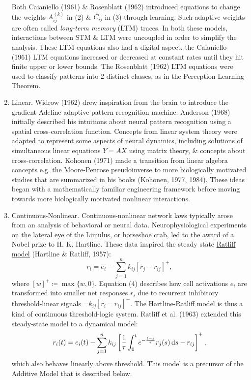 \documentclass{article}
\begin{document}
\begin{enumerate}
	Both Caianiello (1961) \& Rosenblatt (1962) introduced equations to change the weights $A_{ij}^{(k)}$ in (2) \& $C_{ij}$ in (3) through learning. Such adaptive weights are often called {\it long-term memory} (LTM) traces. In both these models, interactions between STM \& LTM were uncoupled in order to simplify the analysis. These LTM equations also had a digital aspect. the Caianiello (1961) LTM equations increased or decreased at constant rates until they hit finite upper or lower bounds. The Rosenblatt (1962) LTM equations were used to classify patterns into 2 distinct classes, as in the Perception Learning Theorem.
	\item {\sf Linear.} Widrow (1962) drew inspiration from the brain to introduce the gradient Adeline adaptive pattern recognition machine. Anderson (1968) initially described his intuitions about neural pattern recognition using a spatial cross-correlation function. Concepts from linear system theory were adapted to represent some aspects of neural dynamics, including solutions of simultaneous linear equations $Y = AX$ using matrix theory, \& concepts about cross-correlation. Kohonen (1971) made a transition from linear algebra concepts e.g. the Moore-Penrose pseudoinverse to more biologically motivated studies that are summarized in his books (Kohonen, 1977, 1984). These ideas began with a mathematically familiar engineering framework before moving towards more biologically motivated nonlinear interactions.
	\item {\sf Continuous-Nonlinear.} Continuous-nonlinear network laws typically arose from an analysis of behavioral or neural data. Neurophysiological experiments on the lateral eye of the Limulus, or horseshoe crab, led to the award of a Nobel prize to {\sc H. K. Hartline}. These data inspired the steady state \href{http://www.scholarpedia.org/article/Hartline-Ratliff_model}{Ratliff model} (Hartline \& Ratliff, 1957):
	\begin{equation}
		r_i = e_i - \sum_{j=1}^n k_{ij}[r_j - r_{ij}]^+,
	\end{equation}
	where $[w]^+\coloneqq\max\{w,0\}$. Equation (4) describes how cell activations $e_i$ are transformed into smaller net responses $r_i$ due to recurrent inhibitory threshold-linear signals $-k_{ij}[r_i - r_{ij}]^+$. The Hartline-Ratliff model is thus a kind of continuous threshold-logic system. Ratliff et al. (1963) extended this steady-state model to a dynamical model:
	\begin{equation}
		r_i(t) = e_i(t) - \sum_{j=1}^n k_{ij}\left[\frac{1}{\tau}\int_0^t e^{-\frac{t - s}{\tau}}r_j(s)\,{\rm d}s - r_{ij}\right]^+,
	\end{equation}
	which also behaves linearly above threshold. This model is a precursor of the Additive Model that is described below.
	

\end{enumerate}
\end{document}
